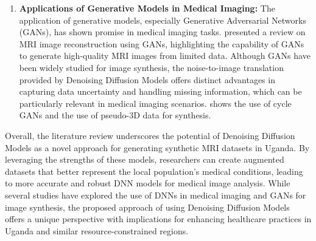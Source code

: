 \begin{enumerate}
    \item {\bf Applications of Generative Models in Medical Imaging:}
    The application of generative models, especially Generative Adversarial Networks (GANs), has shown promise in medical imaging tasks.\cite{mri-Reconstruction-GAN} presented a review on MRI image reconstruction using GANs, highlighting the capability of GANs to generate high-quality MRI images from limited data. Although GANs have been widely studied for image synthesis, the noise-to-image translation provided by Denoising Diffusion Models offers distinct advantages\cite{dhariwal2021diffusion} in capturing data uncertainty and handling missing information, which can be particularly relevant in medical imaging scenarios.\cite{oulbacha2020mri} shows the use of cycle GANs and the use of pseudo-3D data for synthesis.
\end{enumerate}

Overall, the literature review underscores the potential of Denoising Diffusion Models as a novel approach for generating synthetic MRI datasets in Uganda. By leveraging the strengths of these models, researchers can create augmented datasets that better represent the local population's medical conditions, leading to more accurate and robust DNN models for medical image analysis. While several studies have explored the use of DNNs in medical imaging and GANs for image synthesis, the proposed approach of using Denoising Diffusion Models offers a unique perspective with implications for enhancing healthcare practices in Uganda and similar resource-constrained regions.
